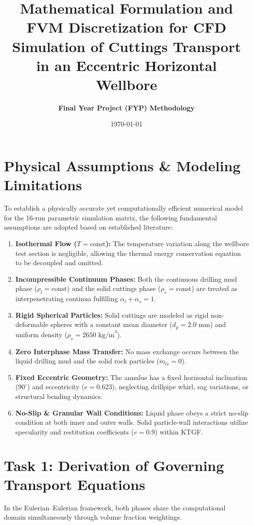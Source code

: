 \documentclass[12pt,a4paper]{article}
\title{\textbf{Mathematical Formulation and FVM Discretization for CFD Simulation of Cuttings Transport in an Eccentric Horizontal Wellbore}}
\author{\textbf{Final Year Project (FYP) Methodology}}
\date{\today}
\begin{document}
\maketitle

\section{Physical Assumptions \& Modeling Limitations}
To establish a physically accurate yet computationally efficient numerical model for the 16-run parametric simulation matrix, the following fundamental assumptions are adopted based on established literature:
\begin{enumerate}
    \item \textbf{Isothermal Flow ($T = \text{const}$):} The temperature variation along the wellbore test section is negligible, allowing the thermal energy conservation equation to be decoupled and omitted.
    \item \textbf{Incompressible Continuum Phases:} Both the continuous drilling mud phase ($\rho_l = \text{const}$) and the solid cuttings phase ($\rho_s = \text{const}$) are treated as interpenetrating continua fulfilling $\alpha_l + \alpha_s = 1$.
    \item \textbf{Rigid Spherical Particles:} Solid cuttings are modeled as rigid non-deformable spheres with a constant mean diameter ($d_p = 2.0\text{ mm}$) and uniform density ($\rho_s = 2650\text{ kg/m}^3$).
    \item \textbf{Zero Interphase Mass Transfer:} No mass exchange occurs between the liquid drilling mud and the solid rock particles ($\dot{m}_{ls} = 0$).
    \item \textbf{Fixed Eccentric Geometry:} The annulus has a fixed horizontal inclination ($90^\circ$) and eccentricity ($e = 0.623$), neglecting drillpipe whirl, sag variations, or structural bending dynamics.
    \item \textbf{No-Slip \& Granular Wall Conditions:} Liquid phase obeys a strict no-slip condition at both inner and outer walls. Solid particle-wall interactions utilize specularity and restitution coefficients ($e = 0.9$) within KTGF.
\end{enumerate}

\section{Task 1: Derivation of Governing Transport Equations}
In the Eulerian--Eulerian framework, both phases share the computational domain simultaneously through volume fraction weightings.
\end{document}

